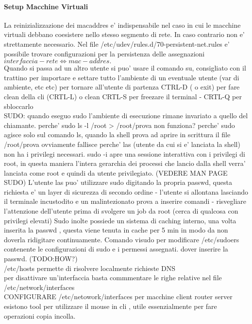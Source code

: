 \documentclass[12pt]{article}
\begin{document}
			\paragraph{Setup Macchine Virtuali}
			La reinizializzazione dei macaddres e' indispensabile nel caso in cui le macchine virtuali debbano coesistere nello
			stesso segmento di rete. In caso contrario non e' strettamente necessario. Nel file /etc/udev/rules.d/70-persistent-net.rules
			e' possibile trovare configurazioni per la persistenza delle assegnazioni $interfaccia-rete \iff mac-addres.$
			\\	
			Quando si passa ad un altro utente si puo' usare il comando su, consigliato con il trattino per importare e settare tutto
			l'ambiente di un eventuale utente (var di ambiente, etc etc)
			per tornare all'utente di partenza CTRL-D ( o exit)
			per fare clean della cli (CRTL-L) o clean
			CRTL-S per freezare il terminal - CRTL-Q per sbloccarlo
			\\
			SUDO: quando eseguo sudo l'ambiente di esecuzione rimane invariato a quello del chiamante.
				perche' sudo ls -l /root > /root/prova non funziona?
				perche' sudo agisce solo sul comando ls, quando la shell prova ad aprire in scrittura il file /root/prova ovviamente
				fallisce perche' las (utente da cui si e' lanciata la shell) non ha i privilegi necessari.
				sudo -i apre una sessione interattiva con i privilegi di root, in questa maniera l'intera gerarchia dei
				processi che lancio dalla shell verra' lanciata come root e quindi da utente privilegiato. (VEDERE MAN PAGE SUDO)
				L'utente las puo' utilizzare sudo digitando la propria passwd, questa richiesta e' un layer di sicurezza di secondo ordine
					- l'utente si allontana lasciando il terminale incustodito e un malintezionato prova a inserire comandi
					- risvegliare l'attenzione dell'utente prima di svolgere un job da root (cerca di qualcosa con privilegi elevati)
				Sudo inolte possiede un sistema di caching interno, una volta inserita la passwd , questa viene tenuta in cache per 5 min
				in modo da non doverla ridigitare continuamente.
				Comando visudo per modificare /etc/sudoers contenente le configurazioni di sudo e i permessi assegnati.
				dover inserire la passwd. (TODO:HOW?)
			\\
			/etc/hosts permette di risolvere localmente richieste DNS
			\\
			per disattivare un'interfaccia basta commmentare le righe relative nel file /etc/network/interfaces
			\\
			CONFIGURARE /etc/netowork/interfaces per macchine client router server
			\\
			esistono tool per utilizzare il mouse in cli , utile essenzialmente per fare operazioni copia incolla. 
\end{document}
